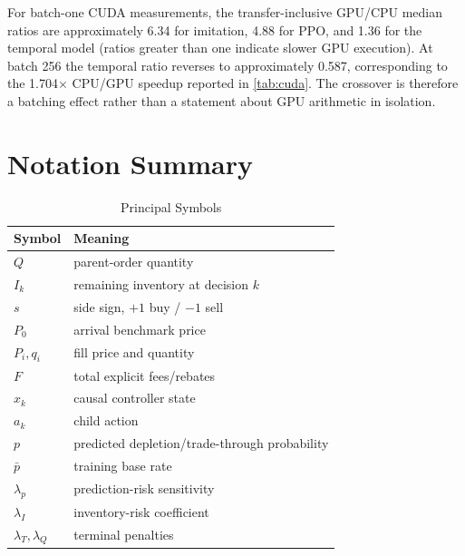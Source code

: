 \documentclass[journal,10pt]{IEEEtran}
\newcommand{\1}{\mathbf{1}}
\begin{document}
For batch-one CUDA measurements, the transfer-inclusive GPU/CPU median ratios are approximately 6.34 for imitation, 4.88 for PPO, and 1.36 for the temporal model (ratios greater than one indicate slower GPU execution). At batch 256 the temporal ratio reverses to approximately 0.587, corresponding to the 1.704$\times$ CPU/GPU speedup reported in \cref{tab:cuda}. The crossover is therefore a batching effect rather than a statement about GPU arithmetic in isolation.

\section{Notation Summary}
\begin{table}[h]
\centering
\caption{Principal Symbols}
\begin{tabular}{ll}
\toprule
Symbol & Meaning \\
\midrule
$Q$ & parent-order quantity \\
$I_k$ & remaining inventory at decision $k$ \\
$s$ & side sign, $+1$ buy / $-1$ sell \\
$P_0$ & arrival benchmark price \\
$P_i,q_i$ & fill price and quantity \\
$F$ & total explicit fees/rebates \\
$x_k$ & causal controller state \\
$a_k$ & child action \\
$p$ & predicted depletion/trade-through probability \\
$\bar p$ & training base rate \\
$\lambda_p$ & prediction-risk sensitivity \\
$\lambda_I$ & inventory-risk coefficient \\
$\lambda_T,\lambda_Q$ & terminal penalties \\
\bottomrule
\end{tabular}
\end{table}



\end{document}
